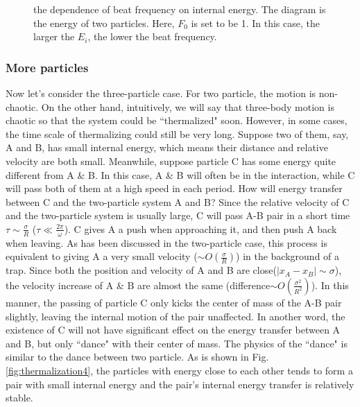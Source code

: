 \documentclass[aps,preprintnumbers,onecolumn,amsmath,amssymb,floatfix,pra]{revtex4-1}
\begin{document}
\begin{figure}[h]
\caption{the dependence of beat frequency on internal energy. The diagram is the energy of two
  particles. Here, $F_0$ is set to be 1. In this case, the larger the $E_i$, the lower the beat
  frequency. \label{fig:thermalization1}}

\end{figure}

\subsubsection{More particles}
Now let's consider the three-particle case. For two particle, the motion is non-chaotic. On the other hand, intuitively, we will say that three-body motion is chaotic so that the system could be ``thermalized" soon. However, in some cases, the time scale of thermalizing could still be very long. Suppose two of them, say, A and B, has small internal energy, which means their distance and relative velocity are both small. Meanwhile, suppose particle C has some energy quite different from A \& B. In this case, A \& B will often be in the interaction, while C will pass both of them at a high speed in each period. How will energy transfer between C and the two-particle system A and B? Since the relative velocity of C and the two-particle system is usually large, C will pass A-B pair in a short time $\tau\sim\frac{\sigma}{R}$ ($\tau\ll\frac{2\pi}{\omega}$). C gives A a push when approaching it, and then push A back when leaving.  As has been discussed in the two-particle case, this process is equivalent to giving A a very small velocity ($\sim O(\frac{\sigma}{R})$) in the background of a trap. Since both the position and velocity of A and B are close($|x_A-x_B|\sim\sigma$), the velocity increase of A \& B are almost the same (difference$\sim O(\frac{\sigma^2}{R^2})$). In this manner, the passing of particle C only kicks the center of mass of the A-B pair slightly, leaving the internal motion of the pair unaffected. In another word, the existence of C will not have significant effect on the energy transfer between A and B, but only ``dance" with their center of mass. The physics of the ``dance" is similar to the dance between two particle. As is shown in Fig.\ref{fig:thermalization4}, the particles with energy close to each other tends to form a pair with small internal energy and the pair's internal energy transfer is relatively stable.
\end{document}
